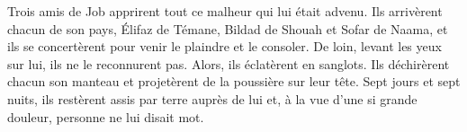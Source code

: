Trois amis de Job apprirent tout ce malheur qui lui était advenu.
Ils arrivèrent chacun de son pays, Élifaz de Témane, Bildad de Shouah et Sofar de Naama,
	et ils se concertèrent pour venir le plaindre et le consoler.
De loin, levant les yeux sur lui, ils ne le reconnurent pas.
	Alors, ils éclatèrent en sanglots.
	Ils déchirèrent chacun son manteau et projetèrent de la poussière sur leur tête.
Sept jours et sept nuits, ils restèrent assis par terre auprès de lui
	et, à la vue d’une si grande douleur, personne ne lui disait mot.

